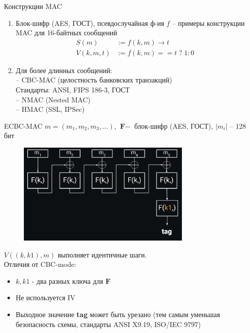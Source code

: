 \documentclass[usenames,dvipsnames,8pt,aspectratio=169]{beamer}
\begin{document}
\begin{frame}{Конструкции MAC}
\Large
\begin{enumerate}
	\itemsep1em
	\item Блок-шифр  (AES, ГОСТ), псевдослучайная ф-ия $f$  -- примеры конструкции MAC для 16-байтных сообщений
	\begin{align*}
			S(m) &:= f(k, m) \rightarrow t \\
			V(k, m, t) & :=f(k, m) == t \; ? \;  1 : 0 
	\end{align*}

	
	\item Для более длинных сообщений:  \\[10pt]
		-- CBC-MAC (целостность банковских транзакций) \\ 
		Стандарты: ANSI, FIPS 186-3, ГОСТ \\[5pt]
		-- NMAC (Nested MAC) \\[5pt]
		-- HMAC (SSL, IPSec)
\end{enumerate}

\end{frame}

\begin{frame}{ECBC-MAC }
\Large
 $m = (m_1, m_2, m_3, ...)$, $\textbf{F}-$ блок-шифр (AES, ГОСТ), $|m_i|$  --  128 бит
	\begin{figure}
		\includegraphics[width=0.75\textwidth]{CBC_MAC}
	\end{figure}
\vspace{-90pt}

\Large 
$V((k, k1), m)$ выполняет идентичные шаги.\\[10pt]

Отличия от CBC-mode:
\begin{itemize}
	\itemsep 5pt
	\item $k, k1$ - два {\color{Orange} разных} ключа для $\textbf{F}$
	\item Не используется IV
	\item Выходное значение \textbf{tag} может быть урезано (тем самым уменьшая безопасность схемы, стандарты ANSI X9.19, ISO/IEC 9797)
\end{itemize}

\end{frame}
\end{document}
